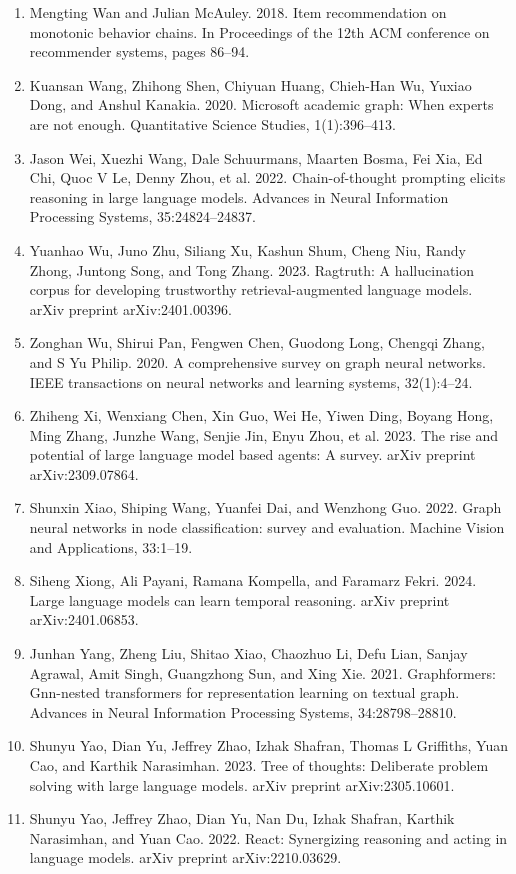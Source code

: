 \documentclass[11pt,UTF8,fontset=fandol]{ctexart}
\begin{document}
\begin{enumerate}[leftmargin=2em]
\item Mengting Wan and Julian McAuley. 2018. Item recommendation on monotonic behavior chains. In Proceedings of the 12th ACM conference on recommender systems, pages 86--94.
\item Kuansan Wang, Zhihong Shen, Chiyuan Huang, Chieh-Han Wu, Yuxiao Dong, and Anshul Kanakia. 2020. Microsoft academic graph: When experts are not enough. Quantitative Science Studies, 1(1):396--413.
\item Jason Wei, Xuezhi Wang, Dale Schuurmans, Maarten Bosma, Fei Xia, Ed Chi, Quoc V Le, Denny Zhou, et al. 2022. Chain-of-thought prompting elicits reasoning in large language models. Advances in Neural Information Processing Systems, 35:24824--24837.
\item Yuanhao Wu, Juno Zhu, Siliang Xu, Kashun Shum, Cheng Niu, Randy Zhong, Juntong Song, and Tong Zhang. 2023. Ragtruth: A hallucination corpus for developing trustworthy retrieval-augmented language models. arXiv preprint arXiv:2401.00396.
\item Zonghan Wu, Shirui Pan, Fengwen Chen, Guodong Long, Chengqi Zhang, and S Yu Philip. 2020. A comprehensive survey on graph neural networks. IEEE transactions on neural networks and learning systems, 32(1):4--24.
\item Zhiheng Xi, Wenxiang Chen, Xin Guo, Wei He, Yiwen Ding, Boyang Hong, Ming Zhang, Junzhe Wang, Senjie Jin, Enyu Zhou, et al. 2023. The rise and potential of large language model based agents: A survey. arXiv preprint arXiv:2309.07864.
\item Shunxin Xiao, Shiping Wang, Yuanfei Dai, and Wenzhong Guo. 2022. Graph neural networks in node classification: survey and evaluation. Machine Vision and Applications, 33:1--19.
\item Siheng Xiong, Ali Payani, Ramana Kompella, and Faramarz Fekri. 2024. Large language models can learn temporal reasoning. arXiv preprint arXiv:2401.06853.
\item Junhan Yang, Zheng Liu, Shitao Xiao, Chaozhuo Li, Defu Lian, Sanjay Agrawal, Amit Singh, Guangzhong Sun, and Xing Xie. 2021. Graphformers: Gnn-nested transformers for representation learning on textual graph. Advances in Neural Information Processing Systems, 34:28798--28810.
\item Shunyu Yao, Dian Yu, Jeffrey Zhao, Izhak Shafran, Thomas L Griffiths, Yuan Cao, and Karthik Narasimhan. 2023. Tree of thoughts: Deliberate problem solving with large language models. arXiv preprint arXiv:2305.10601.
\item Shunyu Yao, Jeffrey Zhao, Dian Yu, Nan Du, Izhak Shafran, Karthik Narasimhan, and Yuan Cao. 2022. React: Synergizing reasoning and acting in language models. arXiv preprint arXiv:2210.03629.

\end{enumerate}
\end{document}
